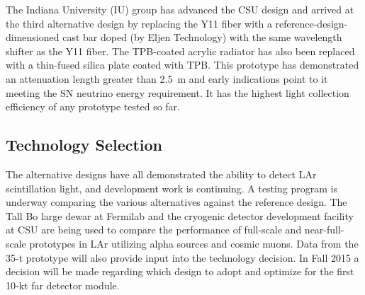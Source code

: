 The Indiana University (IU) group has advanced the CSU design and
arrived at the third alternative design by replacing the Y11 fiber
with a reference-design-dimensioned cast bar doped (by Eljen
Technology) with the same wavelength shifter as the Y11 fiber. The
TPB-coated acrylic radiator has also been replaced with a thin-fused
silica plate coated with TPB. This prototype has demonstrated an
attenuation length greater than 2.5~m and early indications point to
it meeting the SN neutrino energy requirement. It has the highest
light collection efficiency of any prototype tested so far.

\subsection{Technology Selection}

The alternative designs have all demonstrated the ability to detect
LAr scintillation light, and development work is continuing. A testing
program is underway comparing the various alternatives against the
reference design.  The Tall Bo large dewar at Fermilab and the
cryogenic detector development facility at CSU are being used to
compare the performance of full-scale and near-full-scale prototypes
in LAr utilizing alpha sources and cosmic muons. Data from the 35-t
prototype will also provide input into the technology decision. In
Fall 2015 a decision will be made regarding which design to adopt and
optimize for the first 10-kt far detector module.
